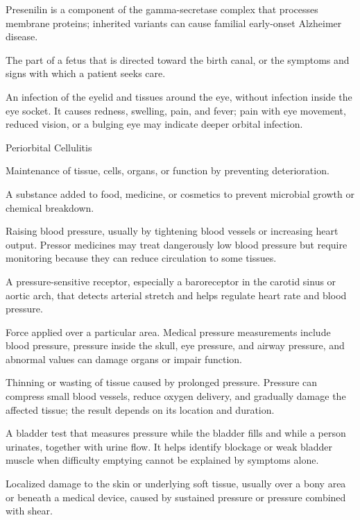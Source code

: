  Presenilin is a component of the gamma-secretase complex that processes membrane proteins; inherited variants can cause familial early-onset Alzheimer disease.

 The part of a fetus that is directed toward the birth canal, or the symptoms and signs with which a patient seeks care.

 An infection of the eyelid and tissues around the eye, without infection inside the eye socket. It causes redness, swelling, pain, and fever; pain with eye movement, reduced vision, or a bulging eye may indicate deeper orbital infection.

\synonyms
Periorbital Cellulitis

 Maintenance of tissue, cells, organs, or function by preventing deterioration.

 A substance added to food, medicine, or cosmetics to prevent microbial growth or chemical breakdown.

 Raising blood pressure, usually by tightening blood vessels or increasing heart output. Pressor medicines may treat dangerously low blood pressure but require monitoring because they can reduce circulation to some tissues.

 A pressure-sensitive receptor, especially a baroreceptor in the carotid sinus or aortic arch, that detects arterial stretch and helps regulate heart rate and blood pressure.

 Force applied over a particular area. Medical pressure measurements include blood pressure, pressure inside the skull, eye pressure, and airway pressure, and abnormal values can damage organs or impair function.

 Thinning or wasting of tissue caused by prolonged pressure. Pressure can compress small blood vessels, reduce oxygen delivery, and gradually damage the affected tissue; the result depends on its location and duration.

 A bladder test that measures pressure while the bladder fills and while a person urinates, together with urine flow. It helps identify blockage or weak bladder muscle when difficulty emptying cannot be explained by symptoms alone.

 Localized damage to the skin or underlying soft tissue, usually over a bony area or beneath a medical device, caused by sustained pressure or pressure combined with shear.

